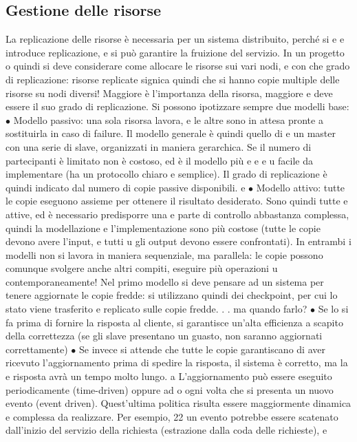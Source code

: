 \subsection{Gestione delle risorse}
La replicazione delle risorse è necessaria per un sistema distribuito, perché si
e
e
introduce replicazione, e si può garantire la fruizione del servizio. In un progetto
o
quindi si deve considerare come allocare le risorse sui vari nodi, e con che grado di replicazione: risorse replicate
signica quindi che si hanno copie multiple
delle risorse su nodi diversi! Maggiore è l'importanza della risorsa, maggiore
e
deve essere il suo grado di replicazione.
Si possono ipotizzare sempre due modelli base:
$\bullet$ Modello passivo: una sola risorsa lavora, e le altre sono in attesa pronte
a sostituirla in caso di failure. Il modello generale è quindi quello di
e
un master con una serie di slave, organizzati in maniera gerarchica. Se
il numero di partecipanti è limitato non è costoso, ed è il modello più
e
e
e
u
facile da implementare (ha un protocollo chiaro e semplice). Il grado di
replicazione è quindi indicato dal numero di copie passive disponibili.
e
$\bullet$ Modello attivo: tutte le copie eseguono assieme per ottenere il risultato
desiderato. Sono quindi tutte e attive, ed è necessario predisporre una
e
parte di controllo abbastanza complessa, quindi la modellazione e l'implementazione sono più costose (tutte le copie
devono avere l'input, e tutti
u
gli output devono essere confrontati).
In entrambi i modelli non si lavora in maniera sequenziale, ma parallela: le
copie possono comunque svolgere anche altri compiti, eseguire più operazioni
u
contemporaneamente!
Nel primo modello si deve pensare ad un sistema per tenere aggiornate le
copie fredde: si utilizzano quindi dei checkpoint, per cui lo stato viene trasferito
e replicato sulle copie fredde. . . ma quando farlo?
$\bullet$ Se lo si fa prima di fornire la risposta al cliente, si garantisce un'alta
efficienza a scapito della correttezza (se gli slave presentano un guasto,
non saranno aggiornati correttamente)
$\bullet$ Se invece si attende che tutte le copie garantiscano di aver ricevuto l'aggiornamento prima di spedire la
risposta, il sistema è corretto, ma la
e
risposta avrà un tempo molto lungo.
a
L'aggiornamento può essere eseguito periodicamente (time-driven) oppure ad
o
ogni volta che si presenta un nuovo evento (event driven). Quest'ultima politica
risulta essere maggiormente dinamica e complessa da realizzare. Per esempio,
22
un evento potrebbe essere scatenato dall'inizio del servizio della richiesta (estrazione dalla coda delle richieste), e
